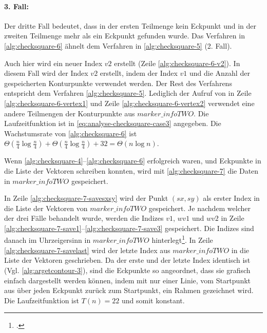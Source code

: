 \paragraph{3. Fall:} %
\label{par:3_fall}
Der dritte Fall bedeutet, dass in der ersten Teilmenge kein Eckpunkt und in der zweiten Teilmenge mehr als ein Eckpunkt
 gefunden wurde. Das Verfahren in \autoref{alg:checksquare-6} ähnelt dem Verfahren in \autoref{alg:checksquare-5}
 (2. Fall).

 Auch hier wird ein neuer Index $\mathit{v2}$ erstellt (Zeile \ref{alg:checksquare-6-v2}). In diesem Fall wird der
 Index $\mathit{v2}$ erstellt, indem der Index $\mathit{v1}$ und die Anzahl der gespeicherten Konturpunkte verwendet
 werden. Der Rest des Verfahrens entspricht dem Verfahren \autoref{alg:checksquare-5}. Lediglich der Aufruf von
  in Zeile \ref{alg:checksquare-6-vertex1} und Zeile \ref{alg:checksquare-6-vertex2} verwendet
 eine andere Teilmengen der Konturpunkte aus $\mathit{marker\_infoTWO}$. Die Laufzeitfunktion ist in
 \autoref{eq:analyse-checksquare-case3} angegeben. Die Wachstumsrate von \autoref{alg:checksquare-6} ist
 $\Theta(\tfrac{n}{4} \log \tfrac{n}{4}) + \Theta(\tfrac{n}{4} \log \tfrac{n}{4}) + 32 = \Theta(n \log n)$.


Wenn \autoref{alg:checksquare-4}--\autoref{alg:checksquare-6} erfolgreich waren, und Eckpunkte in die Liste der
 Vektoren schreiben konnten, wird mit \autoref{alg:checksquare-7} die Daten in $\mathit{marker\_infoTWO}$ gespeichert.

In Zeile \ref{alg:checksquare-7-savesxsy} wird der Punkt $(\mathit{sx},\mathit{sy})$ als erster Index in die Liste der
 Vektoren von $\mathit{marker\_infoTWO}$ gespeichert. Je nachdem welcher der drei Fälle behandelt wurde, werden die
 Indizes $\mathit{v1}$, $\mathit{wv1}$ und $\mathit{wv2}$ in Zeile
 \ref{alg:checksquare-7-save1}--\ref{alg:checksquare-7-save3} gespeichert. Die Indizes sind danach im Uhrzeigersinn in
 $\mathit{marker\_infoTWO}$ hinterlegt\footcite[Vgl.][S.~44]{wagner07a}. In Zeile \ref{alg:checksquare-7-savelast} wird
 der letzte Index aus $\mathit{marker\_infoTWO}$ in die Liste der Vektoren geschrieben. Da der erste und der letzte
 Index identisch ist (Vgl. \autoref{alg:argetcontour-3}), sind die Eckpunkte so angeordnet, dass sie grafisch einfach
 dargestellt werden können, indem mit nur einer Linie, vom Startpunkt aus über jeden Eckpunkt zurück zum Startpunkt,
 ein Rahmen gezeichnet wird. Die Laufzeitfunktion ist $T(n) = 22$ und somit konstant.

